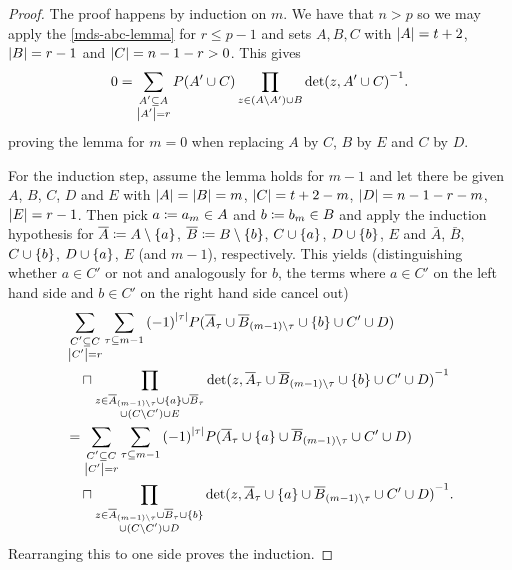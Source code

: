 \begin{proof}
    The proof happens by induction on $m$.
    We have that $n>p$ so we may apply the \autoref{mds-abc-lemma} for $r\leq p-1$ and sets $A,B,C$ with $\left\vert{A}\right\vert=t+2$, $\left\vert{B}\right\vert=r-1$ and $\left\vert{C}\right\vert=n-1-r>0$.
    This gives
    $$ 0 = \sum_{\substack{A'\subseteq A\\\left\vert{A'}\right\vert=r}}{P(A'\cup C)\prod_{z\in (A\setminus A')\cup B}{{\det(z,A'\cup C)}^{-1}}}. $$
    proving the lemma for $m=0$ when replacing $A$ by $C$, $B$ by $E$ and $C$ by $D$.

    For the induction step, assume the lemma holds for $m-1$ and let there be given $A$, $B$, $C$, $D$ and $E$ with $\left\vert{A}\right\vert=\left\vert{B}\right\vert=m$, $\left\vert{C}\right\vert=t+2-m$, $\left\vert{D}\right\vert=n-1-r-m$, $\left\vert{E}\right\vert=r-1$. Then pick $a\mathrel{\mathrel{\mathop:}\mkern-1.2mu=} a_m\in A$ and $b\mathrel{\mathrel{\mathop:}\mkern-1.2mu=} b_m\in B$ and apply the induction hypothesis for $\bar{A}\defeq A\setminus\set{a}$, $\bar{B}\defeq B\setminus\set{b}$, $C\setjoin\set{a}$, $D\setjoin\set{b}$, $E$ and $\bar{A}$, $\bar{B}$, $C\setjoin\set{b}$, $D\setjoin\set{a}$, $E$ (and $m-1$), respectively. 
    This yields (distinguishing whether $a\in C'$ or not and analogously for $b$, the terms where $a\in C'$ on the left hand side and $b\in C'$ on the right hand side cancel out) 
    \begin{align*}
 & \sum_{\substack{C'\setleq C                                                                   \\ \card{C'}=r}}\sum_{\tau\setleq m-1}{{(-1)}^{\card{\tau}}P(\bar{A}_{\tau}\setjoin \bar{B}_{(m-1)\setminus\tau}\setjoin\set{b}\setjoin C'\setjoin D)}\\
 & \quad\setprod\prod_{\substack{z\in \bar{A}_{(m-1)\setminus\tau}\setjoin\set{a}\setjoin \bar{B}_{\tau} \\ \setjoin(C\setminus C')\setjoin E}}{{\det(z,\bar{A}_{\tau}\setjoin \bar{B}_{(m-1)\setminus\tau}\setjoin\set{b}\setjoin C'\setjoin D)}^{-1}}\\
 & = \sum_{\substack{C'\setleq C                                                               \\
         \card{C'}=r}}\sum_{\tau\setleq m-1}{{(-1)}^{\card{\tau}}P(\bar{A}_{\tau}\setjoin\set{a}\setjoin \bar{B}_{(m-1)\setminus\tau}\setjoin C'\setjoin D)}\\
 & \quad\setprod\prod_{\substack{z\in \bar{A}_{(m-1)\setminus\tau}\setjoin \bar{B}_{\tau}\setjoin\set{b} \\\setjoin(C\setminus C')\setjoin D}}{{\det(z,\bar{A}_{\tau}\setjoin\set{a}\setjoin \bar{B}_{(m-1)\setminus\tau}\setjoin C'\setjoin D)}^{-1}}.
    \end{align*}
    Rearranging this to one side proves the induction.
\end{proof}

